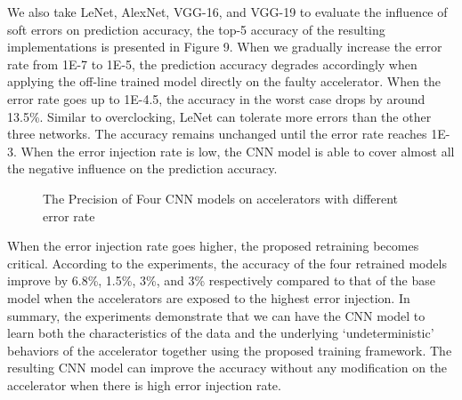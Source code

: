   We also take LeNet, AlexNet, VGG-16, and VGG-19 to evaluate the influence of soft errors on prediction accuracy,
the top-5 accuracy of the resulting implementations is presented in Figure 9. When we gradually 
increase the error rate from 1E-7 to 1E-5, the prediction accuracy degrades accordingly when applying the off-line 
trained model directly on the faulty accelerator. When the error rate goes up to 1E-4.5, 
the accuracy in the worst case drops by around 13.5\%. Similar to overclocking, LeNet can tolerate 
more errors than the other three networks. The accuracy remains unchanged until the error rate reaches 1E-3. 
When the error injection rate is low, the CNN model is able to cover almost all the negative influence 
on the prediction accuracy.

\begin{figure}
        \center
        \qquad
        \qquad
        \qquad
        \caption{The Precision of Four CNN models on accelerators with different error rate}
        \label{fig:softerror accuracy}
\end{figure}

  When the error injection rate goes higher, the proposed retraining becomes critical. 
According to the experiments, the accuracy of the four retrained models improve by 6.8\%, 1.5\%, 3\%, and 3\% 
respectively compared to that of the base model when the accelerators are exposed to the highest 
error injection. In summary, the experiments demonstrate that we can have the CNN model to learn 
both the characteristics of the data and the underlying ‘undeterministic’ behaviors of the accelerator 
together using the proposed training framework. The resulting CNN model can improve the accuracy 
without any modification on the accelerator when there is high error injection rate.  



